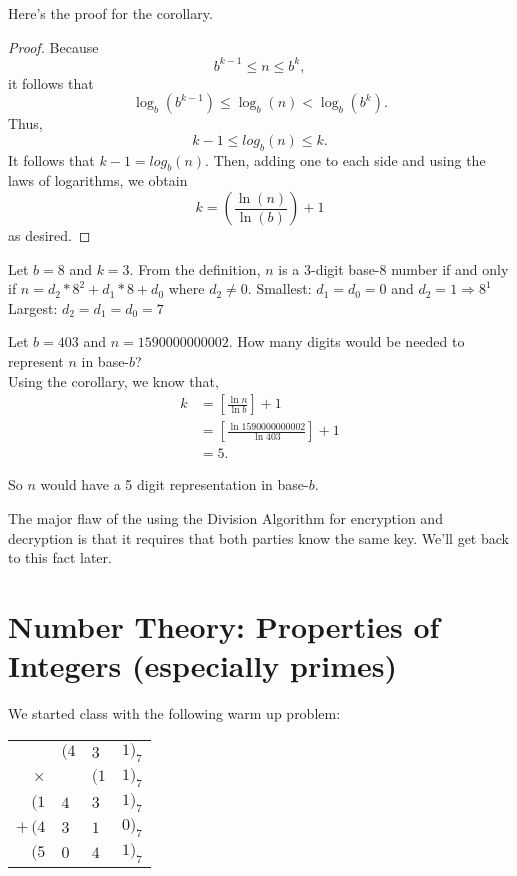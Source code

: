Here's the proof for the corollary.
\begin{proof} Because
\[
b^{k-1} \leq n \le b^{k},\]
it follows that
\[
\log_{b}(b^{k-1}) \leq \log_{b}(n) < \log_{b}(b^{k}).
\]
Thus,
\[
  k-1 \leq log_{b}(n) \le k.
\]
It follows that $k-1 = log_{b}(n)$.  Then, adding one to each side and using the laws of logarithms, we obtain
\[k = (\frac{\ln(n)}{\ln(b)}) + 1\]
as desired.
\end{proof}


\begin{example}
Let $b = 8$ and $k =3$.
From the definition, $n$ is a 3-digit base-8 number if and only if $n = d_{2} * 8^{2} + d_1 * 8 + d_{0}$ where $d_{2} \neq 0$.
Smallest: $d_{1} = d_{0} = 0$ and $d_{2} = 1 \Rightarrow 8^{1}$
Largest: $d_{2} = d_{1} = d_{0} = 7$
\end{example}

\begin{example}
Let $b = 403$ and $n = 1590000000002$. How many digits would be needed to represent $n$ in base-$b$?\\

Using the corollary, we know that,\\
\begin{align*}
k &= \left[\frac{\ln {n}}{\ln {b}}\right] + 1\\
&= \left[\frac{\ln{1590000000002}}{\ln{403}}\right] + 1\\
&= 5.
\end{align*}




So $n$ would have a 5 digit representation in base-$b$.\\
\end{example}

The major flaw of the using the Division Algorithm for encryption and decryption is that it requires that both parties know the same key. We'll get back to this fact later.


\section{Number Theory: Properties of Integers (especially primes)}

We started class with the following warm up problem:

\begin{center}
\begin{tabular}{r l l l}
         & $(4$ & $3$  & $1)_{7}$\\
$\times$ &      & $(1$ & $1)_{7}$\\
\hline
    $(1$ & $4$  & $3$  & $1)_{7}$\\
 $+\,(4$ & $3$  & $1$  & $0)_{7}$\\
 \hline
    $(5$ & $0$  & $4$ & $1)_{7}$
\end{tabular}
\end{center}

